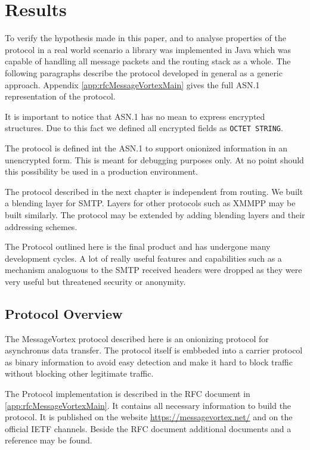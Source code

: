 
\part{Results}
To verify the hypothesis made in this paper, and to analyse properties of the protocol in a real world scenario a library was implemented in Java which was capable of handling all message packets and the routing stack as a whole. The following paragraphs describe the protocol developed in general as a generic approach. Appendix \ref{app:rfcMessageVortexMain} gives the full ASN.1 representation of the protocol. 

It is important to notice that ASN.1 has no mean to express encrypted structures. Due to this fact we defined all encrypted fields as \verb|OCTET STRING|. 

The protocol is defined int the ASN.1 to support onionized information in an unencrypted form. This is meant for debugging purposes only. At no point should this possibility be used in a production environment.

The protocol described in the next chapter is independent from routing. We built a blending layer for SMTP. Layers for other protocols such as XMMPP may be built similarly. The protocol may be extended by adding blending layers and their addressing schemes.

The Protocol outlined here is the final product and has undergone many development cycles. A lot of really useful features and capabilities such as a mechanism analoguous to the SMTP received headers were dropped as they were very useful but threatened security or anonymity.

\chapter{Protocol Overview}
The MessageVortex protocol described here is an onionizing protocol for asynchronus data transfer. The protocol itself is embbeded into a carrier protocol as binary information to avoid easy detection and make it hard to block traffic without blocking other legitimate traffic.

The Protocol implementation is described in the RFC document in \ref{app:rfcMessageVortexMain}. It contains all necessary information to build the protocol. It is published on the website \url{https://messagevortex.net/} and on the official IETF channels. Beside the RFC document additional documents and a reference may be found.

